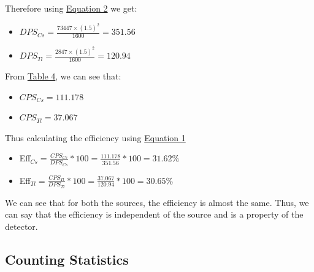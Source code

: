 		Therefore using \hyperref[eq:2]{Equation 2} we get:
		\begin{itemize}
			\item $DPS_{Cs} = \frac{73447 \times (1.5)^2}{1600} = 351.56$
			\item $DPS_{Tl} = \frac{2847 \times (1.5)^2}{1600} = 120.94$
		\end{itemize}

		From \hyperref[tab:4]{Table 4}, we can see that:
		\begin{itemize}
			\item $CPS_{Cs} = 111.178$
			\item $CPS_{Tl} =  37.067$
		\end{itemize}

		Thus calculating the efficiency using \hyperref[eq:1]{Equation 1}
		\begin{itemize}
			\item Eff$_{Cs} = \frac{CPS_{Cs}}{DPS_{Cs}}*100 = \frac{111.178}{351.56}*100 = 31.62\%$
			\item Eff$_{Tl} = \frac{CPS_{Tl}}{DPS_{Tl}}*100 = \frac{37.067}{120.94}*100 = 30.65\%$
		\end{itemize}

		We can see that for both the sources, the efficiency is almost the same. Thus, we can say that the efficiency is independent of the source and is a property of the detector.



	\subsection{Counting Statistics}

